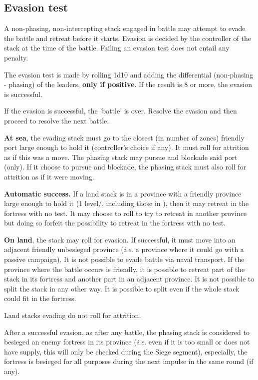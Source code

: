 \subsection{Evasion test}
\label{chMilitary:Battle:Evasion}
A non-phasing, non-intercepting stack engaged in battle may attempt to evade
the battle and retreat before it starts. Evasion is decided by the controller
of the stack at the time of the battle. Failing an evasion test does not
entail any penalty.

The evasion test is made by rolling 1d10 and adding the \Man differential
(non-phasing - phasing) of the leaders, \textbf{only if positive}. If the
result is 8 or more, the evasion is successful.

If the evasion is successful, the 'battle' is over. Resolve the evasion and
then proceed to resolve the next battle.

\textbf{At sea}, the evading stack must go to the closest (in number of zones)
friendly port large enough to hold it (controller's choice if any). It must
roll for attrition as if this was a move. The phasing stack may pursue and
blockade said port (only). If it choose to pursue and blockade, the phasing
stack must also roll for attrition as if it were moving.

\textbf{Automatic success.} If a land stack is in a province with a friendly
province large enough to hold it (1 level/\LD, including those in \Pashas),
then it may retreat in the fortress with no test. It may choose to roll to try
to retreat in another province but doing so forfeit the possibility to retreat
in the fortress with no test.

\textbf{On land}, the stack may roll for evasion. If successful, it must move
into an adjacent friendly unbesieged province (\emph{i.e.} a province where it
could go with a passive campaign). It is not possible to evade battle via
naval transport. If the province where the battle occurs is friendly, it is
possible to retreat part of the stack in its fortress and another part in an
adjacent province. It is not possible to split the stack in any other way. It
is possible to split even if the whole stack could fit in the fortress.

Land stacks evading do not roll for attrition.

After a successful evasion, as after any battle, the phasing stack is
considered to besieged an enemy fortress in its province (\emph{i.e.} even if
it is too small or does not have supply, this will only be checked during the
Siege segment), especially, the fortress is besieged for all purposes during
the next impulse in the same round (if any).

